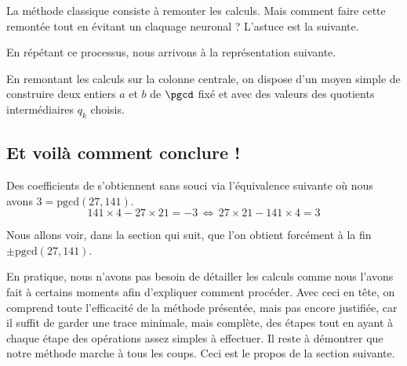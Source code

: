 La méthode classique consiste à remonter les calculs. Mais comment faire cette remontée tout en évitant un claquage neuronal ? L'astuce est la suivante.


\begin{multicols}{2}

	\columnbreak
	
\end{multicols}




\medskip


\vfill\newpage

En répétant ce processus, nous arrivons à la représentation suivante.



\begin{remark}
	En remontant les calculs sur la colonne centrale, on dispose d'un moyen simple de construire deux entiers $a$ et $b$ de $\pgcd$ fixé et avec des valeurs des quotients intermédiaires $q_k$ choisis.
\end{remark}




\subsection{Et voilà comment conclure !}



\medskip


Des coefficients de \bb{} s'obtiennent sans souci via l'équivalence suivante où nous avons $3 = \mathrm{pgcd}(27 , 141)$.
\[141 \times 4 - 27 \times 21 = -3 \,\Longleftrightarrow\, 27 \times 21 - 141 \times 4 = 3\]


\medskip


Nous allons voir, dans la section qui suit, que l'on obtient forcément à la fin $\pm \mathrm{pgcd}(27 , 141)$. 


\medskip


En pratique, nous n'avons pas besoin de détailler les calculs comme nous l'avons fait à certains moments afin d'expliquer comment procéder.
Avec ceci en tête, on comprend toute l'efficacité de la méthode présentée, mais pas encore justifiée, car il suffit de garder une trace minimale, mais complète, des étapes tout en ayant à chaque étape des opérations assez simples à effectuer.
Il reste à démontrer que notre méthode marche à tous les coups. Ceci est le propos de la section suivante.
	